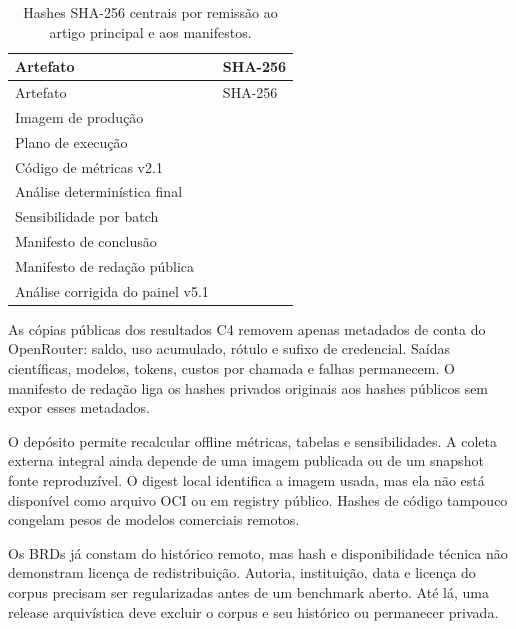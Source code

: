 \documentclass[11pt,a4paper]{article}
\begin{document}
\begingroup
\footnotesize
\setlength{\tabcolsep}{3pt}
\begin{longtable}{@{}P{4.1cm}p{10.4cm}@{}}
\caption{Hashes SHA-256 centrais por remissão ao artigo principal e aos manifestos.}\label{tab:s-hashes}\\
\toprule
Artefato & SHA-256 \\
\midrule
\endfirsthead
\toprule
Artefato & SHA-256 \\
\midrule
\endhead
Imagem de produção &  \\
Plano de execução &  \\
Código de métricas v2.1 &  \\
Análise determinística final &  \\
Sensibilidade por batch &  \\
Manifesto de conclusão &  \\
Manifesto de redação pública &  \\
Análise corrigida do painel v5.1 &  \\
\bottomrule
\end{longtable}
\endgroup

As cópias públicas dos resultados C4 removem apenas metadados de conta do OpenRouter: saldo, uso acumulado, rótulo e sufixo de credencial. Saídas científicas, modelos, tokens, custos por chamada e falhas permanecem. O manifesto de redação liga os hashes privados originais aos hashes públicos sem expor esses metadados.

O depósito permite recalcular offline métricas, tabelas e sensibilidades. A coleta externa integral ainda depende de uma imagem publicada ou de um snapshot fonte reproduzível. O digest local identifica a imagem usada, mas ela não está disponível como arquivo OCI ou em registry público. Hashes de código tampouco congelam pesos de modelos comerciais remotos.

Os BRDs já constam do histórico remoto, mas hash e disponibilidade técnica não demonstram licença de redistribuição. Autoria, instituição, data e licença do corpus precisam ser regularizadas antes de um benchmark aberto. Até lá, uma release arquivística deve excluir o corpus e seu histórico ou permanecer privada.
\end{document}
